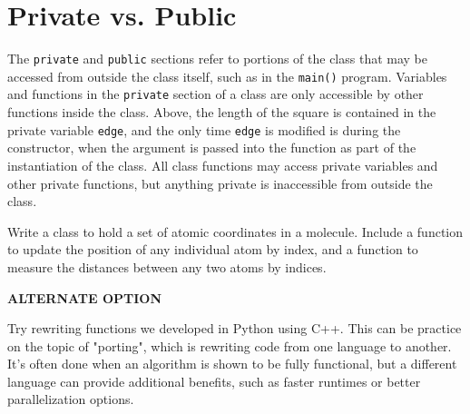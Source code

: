 \section{Private vs. Public}
The \texttt{private} and \texttt{public} sections refer to portions of the class that may be accessed from outside the class itself, such as in the \texttt{main()} program.  Variables and functions in the \texttt{private} section of a class are only accessible by other functions inside the class.  Above, the length of the square is contained in the private variable \texttt{edge}, and the only time \texttt{edge} is modified is during the constructor, when the argument is passed into the function as part of the instantiation of the class.  All class functions may access private variables and other private functions, but anything private is inaccessible from outside the class.

\begin{homework}
Write a class to hold a set of atomic coordinates in a molecule.  Include a function to update the position of any individual atom by index, and a function to measure the distances between any two atoms by indices.
\end{homework}

\textbf{ALTERNATE OPTION}

\begin{homework}
Try rewriting functions we developed in Python using C++.  This can be practice on the topic of "porting", which is rewriting code from one language to another.  It's often done when an algorithm is shown to be fully functional, but a different language can provide additional benefits, such as faster runtimes or better parallelization options.
\end{homework}

